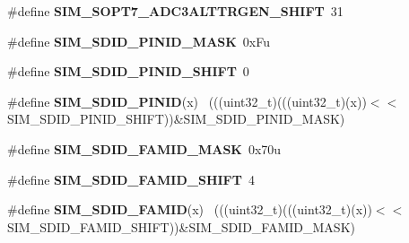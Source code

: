 \begin{DoxyCompactItemize}
\item 
\hypertarget{group___s_i_m___register___masks_gabb1f077a9b90ab83ac6b54b1487fc1c4}{}\#define {\bfseries S\+I\+M\+\_\+\+S\+O\+P\+T7\+\_\+\+A\+D\+C3\+A\+L\+T\+T\+R\+G\+E\+N\+\_\+\+S\+H\+I\+F\+T}~31\label{group___s_i_m___register___masks_gabb1f077a9b90ab83ac6b54b1487fc1c4}

\item 
\hypertarget{group___s_i_m___register___masks_gaf0820acb74ce8270da2025fee624b47c}{}\#define {\bfseries S\+I\+M\+\_\+\+S\+D\+I\+D\+\_\+\+P\+I\+N\+I\+D\+\_\+\+M\+A\+S\+K}~0x\+Fu\label{group___s_i_m___register___masks_gaf0820acb74ce8270da2025fee624b47c}

\item 
\hypertarget{group___s_i_m___register___masks_ga593faac0d0629fde52f6fe4b83614c23}{}\#define {\bfseries S\+I\+M\+\_\+\+S\+D\+I\+D\+\_\+\+P\+I\+N\+I\+D\+\_\+\+S\+H\+I\+F\+T}~0\label{group___s_i_m___register___masks_ga593faac0d0629fde52f6fe4b83614c23}

\item 
\hypertarget{group___s_i_m___register___masks_ga3ab62e28831b168141d554c707ac5c87}{}\#define {\bfseries S\+I\+M\+\_\+\+S\+D\+I\+D\+\_\+\+P\+I\+N\+I\+D}(x)                                            ~(((uint32\+\_\+t)(((uint32\+\_\+t)(x))$<$$<$S\+I\+M\+\_\+\+S\+D\+I\+D\+\_\+\+P\+I\+N\+I\+D\+\_\+\+S\+H\+I\+F\+T))\&S\+I\+M\+\_\+\+S\+D\+I\+D\+\_\+\+P\+I\+N\+I\+D\+\_\+\+M\+A\+S\+K)\label{group___s_i_m___register___masks_ga3ab62e28831b168141d554c707ac5c87}

\item 
\hypertarget{group___s_i_m___register___masks_ga5344e7283b2aead14d9d3bded0114f3b}{}\#define {\bfseries S\+I\+M\+\_\+\+S\+D\+I\+D\+\_\+\+F\+A\+M\+I\+D\+\_\+\+M\+A\+S\+K}~0x70u\label{group___s_i_m___register___masks_ga5344e7283b2aead14d9d3bded0114f3b}

\item 
\hypertarget{group___s_i_m___register___masks_ga377bc761e6ee1caab79baad3e2d0d331}{}\#define {\bfseries S\+I\+M\+\_\+\+S\+D\+I\+D\+\_\+\+F\+A\+M\+I\+D\+\_\+\+S\+H\+I\+F\+T}~4\label{group___s_i_m___register___masks_ga377bc761e6ee1caab79baad3e2d0d331}

\item 
\hypertarget{group___s_i_m___register___masks_ga1c53c57d3312af915fc5419efec0b651}{}\#define {\bfseries S\+I\+M\+\_\+\+S\+D\+I\+D\+\_\+\+F\+A\+M\+I\+D}(x)                                            ~(((uint32\+\_\+t)(((uint32\+\_\+t)(x))$<$$<$S\+I\+M\+\_\+\+S\+D\+I\+D\+\_\+\+F\+A\+M\+I\+D\+\_\+\+S\+H\+I\+F\+T))\&S\+I\+M\+\_\+\+S\+D\+I\+D\+\_\+\+F\+A\+M\+I\+D\+\_\+\+M\+A\+S\+K)\label{group___s_i_m___register___masks_ga1c53c57d3312af915fc5419efec0b651}


\end{DoxyCompactItemize}
